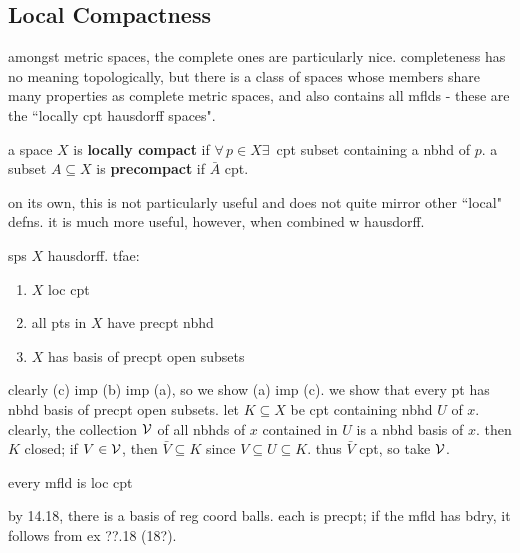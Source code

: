 \subsection{Local Compactness}
amongst metric spaces, the complete ones are particularly nice.
completeness has no meaning topologically, but there is a class of spaces
whose members share many properties as complete metric spaces, and also
contains all mflds - these are the ``locally cpt hausdorff spaces".

\begin{defn}
    a space $X$ is \textbf{locally compact} if $\forall \, p\in X\exists \, $ cpt
    subset containing a nbhd of $p$.
    a subset $A\subseteq X$ is \textbf{precompact} if $\bar{A}$ cpt.
\end{defn}
on its own, this is not particularly useful and does not quite mirror other
``local" defns. it is much more useful, however, when combined w hausdorff.

\begin{prop}
    sps $X$ hausdorff. tfae: \vspace{-0.2in}
    \begin{enumerate}[(\alph*)]
        \item $X$ loc cpt
        \item all pts in $X$ have precpt nbhd
        \item $X$ has basis of precpt open subsets
    \end{enumerate}
\end{prop}

\begin{pf}[source=Primary Source Material]
    clearly (c) imp (b) imp (a), so we show (a) imp (c).
    we show that every pt has nbhd basis of precpt open subsets.
    let $K\subseteq X$ be cpt containing nbhd $U$ of $x$.
    clearly, the collection $\mathcal{V}$ of all nbhds of $x$ contained in $U$ is
    a nbhd basis of $x$.
    then $K$ closed; if $V\in\mathcal{V}$, then $\bar{V}\subseteq K$ since
    $V\subseteq U\subseteq K$.
    thus $\bar{V}$ cpt, so take $\mathcal{V}$.
\end{pf}

\begin{prop}
    every mfld is loc cpt
\end{prop}

\begin{pf}[source=Primary Source Material]
    by 14.18, there is a basis of reg coord balls.
    each is precpt; if the mfld has bdry, it follows from ex ??.18 (18?).
\end{pf}



